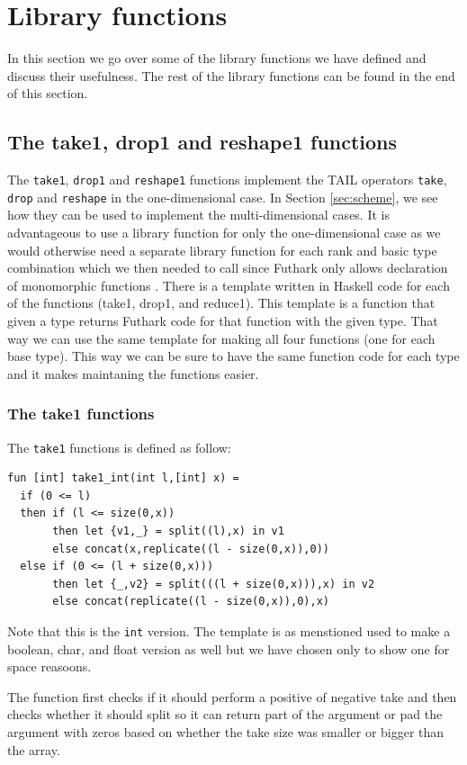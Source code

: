 \documentclass[11pt]{article}
\begin{document}
\section{Library functions}
\label{sec:library}
In this section we go over some of the library functions we have defined and discuss their usefulness. The rest of the  library functions can be found in the end of this section. 

\subsection{The take1, drop1 and reshape1 functions}
The {\tt take1}, {\tt drop1} and {\tt reshape1} functions implement the TAIL operators {\tt take}, {\tt drop} and {\tt reshape} in the one-dimensional case. In Section \ref{sec:scheme}, we see how they can be used to implement the multi-dimensional cases. It is advantageous to use a library function for only the one-dimensional case as we would otherwise need a separate library function for each 
rank and basic type combination which we then needed to call since Futhark only allows declaration of monomorphic functions \cite{TroelsHenriksen}.
There is a template written in Haskell code for each of the functions (take1, drop1, and reduce1). This template is a function that given a type returns Futhark code for that function with the given type. That way we can use the same template for making all four functions (one for each base type). This way we can be sure to have the same function code for each type and it makes maintaning the functions easier. 

\subsubsection{The take1 functions}
The {\tt take1} functions is defined as follow: 
\begin{lstlisting}[language=Futhark]
fun [int] take1_int(int l,[int] x) =
  if (0 <= l)
  then if (l <= size(0,x))
       then let {v1,_} = split((l),x) in v1
       else concat(x,replicate((l - size(0,x)),0))
  else if (0 <= (l + size(0,x)))
       then let {_,v2} = split(((l + size(0,x))),x) in v2
       else concat(replicate((l - size(0,x)),0),x)
\end{lstlisting}
Note that this is the {\tt int} version. The template is as menstioned used to make a boolean, char, and float version as well but we have chosen only to show one for space reasoons. 

The function first checks if it should perform a positive of negative take and then checks whether it should split so it can return
part of the argument or pad the argument with zeros based on whether the take size was smaller or bigger than the array.
\end{document}
